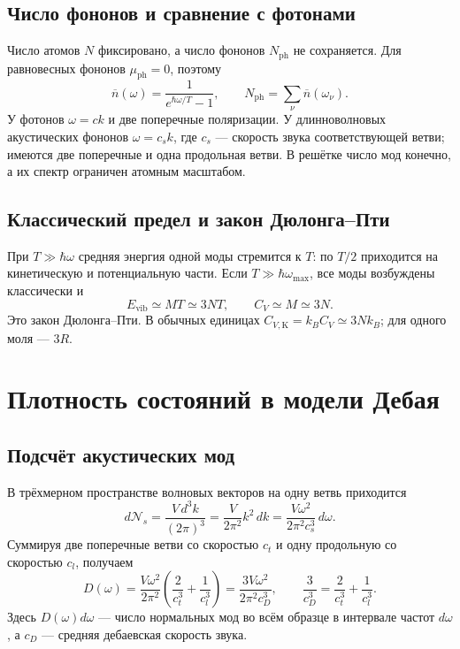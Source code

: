 \documentclass[../final.tex]{subfiles}
\begin{document}
\subsection{Число фононов и сравнение с фотонами}
Число атомов $N$ фиксировано, а число фононов $N_{\mathrm{ph}}$ не сохраняется.
Для равновесных фононов $\mu_{\mathrm{ph}}=0$, поэтому
\begin{equation*}
 \overline n(\omega)=\frac1{e^{\hbar\omega/T}-1},\qquad
 N_{\mathrm{ph}}=\sum_\nu\overline n(\omega_\nu).
\end{equation*}
У фотонов $\omega=ck$ и две поперечные поляризации.
У длинноволновых акустических фононов $\omega=c_sk$, где $c_s$ --- скорость звука
соответствующей ветви; имеются две поперечные и одна продольная ветви.
В решётке число мод конечно, а их спектр ограничен атомным масштабом.

\subsection{Классический предел и закон Дюлонга--Пти}
При $T\gg\hbar\omega$ средняя энергия одной моды стремится к $T$:
по $T/2$ приходится на кинетическую и потенциальную части.
Если $T\gg\hbar\omega_{\max}$, все моды возбуждены классически и
\begin{equation*}
 E_{\mathrm{vib}}\simeq MT\simeq3NT,\qquad C_V\simeq M\simeq3N.
\end{equation*}
Это закон Дюлонга--Пти. В обычных единицах
$C_{V,\mathrm K}=k_BC_V\simeq3Nk_B$; для одного моля --- $3R$.

\clearpage
\section{Плотность состояний в модели Дебая}
\subsection{Подсчёт акустических мод}
В трёхмерном пространстве волновых векторов на одну ветвь приходится
\begin{equation*}
 d\mathcal N_s=\frac{V\,d^3k}{(2\pi)^3}
 =\frac{V}{2\pi^2}k^2\,dk
 =\frac{V\omega^2}{2\pi^2c_s^3}\,d\omega.
\end{equation*}
Суммируя две поперечные ветви со скоростью $c_t$ и одну продольную
со скоростью $c_l$, получаем
\begin{equation*}
 D(\omega)=\frac{V\omega^2}{2\pi^2}
 \left(\frac2{c_t^3}+\frac1{c_l^3}\right)
 =\frac{3V\omega^2}{2\pi^2c_D^3},\qquad
 \frac3{c_D^3}=\frac2{c_t^3}+\frac1{c_l^3}.
\end{equation*}
Здесь $D(\omega)d\omega$ --- число нормальных мод во всём образце
в интервале частот $d\omega$, а $c_D$ --- средняя дебаевская скорость звука.
\end{document}

